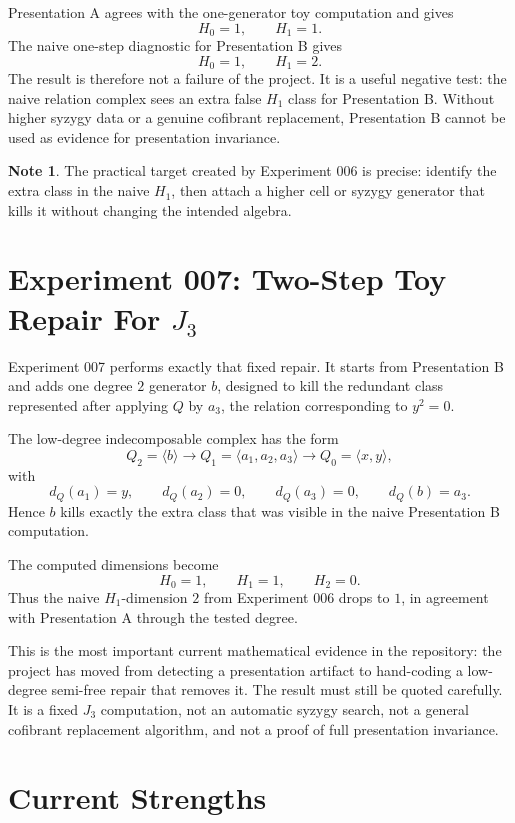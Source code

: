 \documentclass[11pt]{report}
\theoremstyle{definition}
\newtheorem{note}{Note}[chapter]
\theoremstyle{plain}
\begin{document}
Presentation A agrees with the one-generator toy computation and gives
\[
  H_0=1,\qquad H_1=1.
\]
The naive one-step diagnostic for Presentation B gives
\[
  H_0=1,\qquad H_1=2.
\]
The result is therefore not a failure of the project. It is a useful negative
test: the naive relation complex sees an extra false \(H_1\) class for
Presentation B. Without higher syzygy data or a genuine cofibrant replacement,
Presentation B cannot be used as evidence for presentation invariance.

\begin{note}
The practical target created by Experiment 006 is precise: identify the extra
class in the naive \(H_1\), then attach a higher cell or syzygy generator that
kills it without changing the intended algebra.
\end{note}

\section{\texorpdfstring{Experiment 007: Two-Step Toy Repair For \(J_3\)}{Experiment 007: Two-Step Toy Repair For J3}}

Experiment 007 performs exactly that fixed repair. It starts from Presentation
B and adds one degree \(2\) generator \(b\), designed to kill the redundant
class represented after applying \(Q\) by \(a_3\), the relation corresponding
to \(y^2=0\).

The low-degree indecomposable complex has the form
\[
  Q_2=\langle b\rangle
  \longrightarrow
  Q_1=\langle a_1,a_2,a_3\rangle
  \longrightarrow
  Q_0=\langle x,y\rangle,
\]
with
\[
  d_Q(a_1)=y,\qquad
  d_Q(a_2)=0,\qquad
  d_Q(a_3)=0,\qquad
  d_Q(b)=a_3.
\]
Hence \(b\) kills exactly the extra class that was visible in the naive
Presentation B computation.

The computed dimensions become
\[
  H_0=1,\qquad H_1=1,\qquad H_2=0.
\]
Thus the naive \(H_1\)-dimension \(2\) from Experiment 006 drops to \(1\), in
agreement with Presentation A through the tested degree.

This is the most important current mathematical evidence in the repository:
the project has moved from detecting a presentation artifact to hand-coding a
low-degree semi-free repair that removes it. The result must still be quoted
carefully. It is a fixed \(J_3\) computation, not an automatic syzygy search,
not a general cofibrant replacement algorithm, and not a proof of full
presentation invariance.

\section{Current Strengths}
\end{document}
